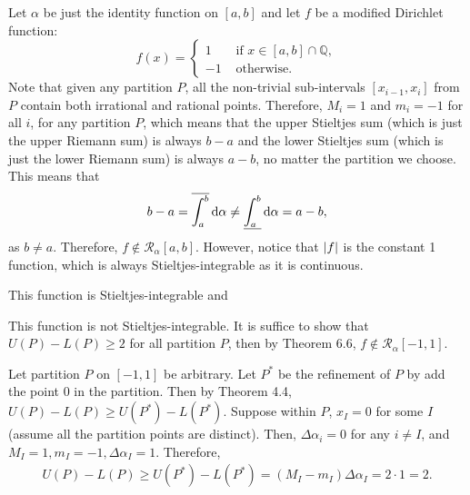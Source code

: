 \documentclass[12pt]{article}
\begin{document}
\begin{fproof}[3]
  Let \(\alpha\) be just the identity function on \([a,b]\) and let \(f\) be a modified Dirichlet function:
\[
f(x) = \begin{cases}
  1 &\text{ if } x \in [a,b] \cap \mathbb{Q},\\
  -1 &\text{ otherwise.}
\end{cases}
\]
Note that given any partition \(P\), all the non-trivial sub-intervals \([x_{i-1}, x_i]\) from \(P\) contain both irrational and rational points.
Therefore, \(M_i = 1\) and \(m_i = -1\) for all \(i\), for any partition \(P\), which means that the upper Stieltjes sum (which is just the upper Riemann sum) is always \(b-a\) and the lower Stieltjes sum (which is just the lower Riemann sum) is always \(a-b\), no matter the partition we choose.
This means that
\begin{align*}
  b-a = \overline{\int_{a}^{b}} \mathop{}\!\mathrm{d}\alpha \neq \underline{\int_{a}^{b}} \mathop{}\!\mathrm{d}\alpha = a-b,
\end{align*}
as \(b \neq a\).
Therefore, \(f \notin \mathcal{R}_{\alpha}[a,b]\).
However, notice that \(\left\lvert f \right\rvert\) is the constant 1 function, which is always Stieltjes-integrable as it is continuous.
\end{fproof}
\newpage

\begin{fproof}[4(a)]
  This function is Stieltjes-integrable and 
\end{fproof}

\begin{fproof}[4(b)]
\end{fproof}

\begin{fproof}[4(c)]
  This function is not Stieltjes-integrable.
  It is suffice to show that \(U(P) - L(P) \geq 2\) for all partition \(P\), then by Theorem 6.6, \(f \notin \mathcal{R}_{\alpha}[-1,1]\).
  
  Let partition \(P\) on \([-1,1]\) be arbitrary. Let \(P^*\) be the refinement of \(P\) by add the point \(0\) in the partition.
  Then by Theorem 4.4, \(U(P) - L(P) \geq U(P^*) - L(P^*)\).
  Suppose within \(P\), \(x_{I} = 0\) for some \(I\) (assume all the partition points are distinct).
  Then, \(\Delta \alpha_i = 0\) for any \(i \neq I\), and \(M_I = 1, m_I = -1, \Delta \alpha_I = 1\).
  Therefore,
  \begin{align*}
    U(P) - L(P) \geq U(P^*) - L(P^*) = (M_I - m_I) \Delta \alpha_I = 2 \cdot 1 = 2.
  \end{align*}
\end{fproof}
\end{document}
